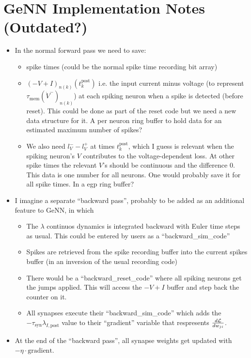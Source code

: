 \documentclass[a4paper]{article}
\begin{document}
\section{GeNN Implementation Notes (Outdated?)}
\begin{itemize}
\item In the normal forward pass we need to save:
  \begin{itemize}
    \item spike times (could be the normal spike time recording bit array)
    \item $(-V+I)_{n(k)}(t_k^{\text{post}})$ i.e. the input current
      minus voltage (to represent $\tau_{\text{mem}}
      (\dot{V}^-)_{n(k)}$) at each spiking neuron when a spike is
      detected (before reset). This could be done as part of the reset
      code but we need a new data structure for it. A per neuron ring
      buffer to hold data for an estimated maximum number of spikes?
    \item We also need $l_V^- - l_V^+$ at times $t_k^{\text{post}}$,
      which I guess is relevant when the spiking neuron's $V$
      contributes to the voltage-dependent loss. At other spike times
      the relevant $V$'s should be continuous and the difference
      $0$. This data is one number for all neurons. One would probably
      save it for all spike times. In a egp ring buffer?
  \end{itemize}
\item I imagine a separate ``backward pass'', probably to be added as
  an additional feature to GeNN, in which
  \begin{itemize}
  \item The $\lambda$ continuos dynamics is integrated backward with Euler
    time steps as usual. This could be entered by users as a
    ``backward\_sim\_code''
  \item Spikes are retrieved from the spike recording buffer into
    the current spikes buffer (in an inversion of the usual
    recording code)
  \item There would be a ``backward\_reset\_code'' where all
    spiking neurons get the jumps applied. This will access the
    $-V+I$ buffer and step back the counter on it.
  \item All synapses execute their ``backward\_sim\_code'' which
    adds the $-\tau_{\text{syn}} \lambda_{I,\text{post}}$ value to
    their ``gradient'' variable that respresents $\frac{d \cal
      L}{d w_{ji}}$.
  \end{itemize}
\item At the end of the ``backward pass'', all synapse weights get updated
  with $-\eta \cdot \text{gradient}$.
\end{itemize}
\end{document}

